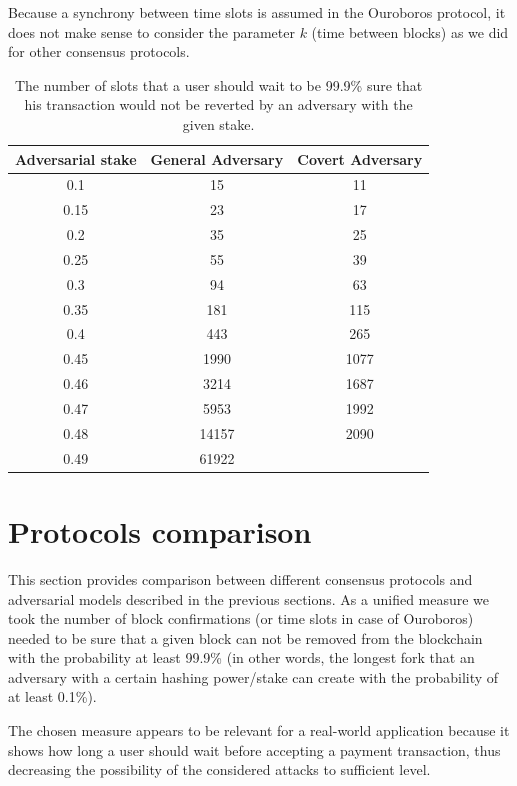 \documentclass[10pt,a4paper]{article}
\numberwithin{equation}{section} %
\theoremstyle{plain}
\theoremstyle{definition}
\theoremstyle{remark}
\begin{document}
    Because a synchrony between time slots is assumed in the Ouroboros protocol, it does not make sense to consider the parameter \(k\) (time between blocks) as we did for other consensus protocols.
    \begin{table}[h!]
        \label{tbl:ouroboros_fork_lengths}
        \centering
    \begin{tabular}{ | c || c | c | }
         \hline 
         Adversarial stake & General Adversary & Covert Adversary \\
         \hline
         0.1   & 15  & 11   \\
         0.15  & 23  & 17  \\
         0.2   & 35  & 25  \\
         0.25  & 55  & 39  \\
         0.3   & 94  & 63  \\
         0.35  & 181 & 115 \\
         0.4   & 443 & 265 \\
         0.45  & 1990  & 1077 \\
         0.46  & 3214  & 1687 \\
         0.47  & 5953  & 1992 \\
         0.48  & 14157  & 2090 \\
         0.49  & 61922  &      \\
         \hline
    \end{tabular}
    \caption{The number of slots that a user should wait to be 99.9\% sure that his transaction would not be reverted by an adversary with the given stake.}
    \end{table}
	
	\section{Protocols comparison}
	
	This section provides comparison between different consensus protocols and adversarial models described in the previous sections. As a unified measure we took the number of block confirmations (or time slots in case of Ouroboros) needed to be sure that a given block can not be removed from the blockchain with the probability at least 99.9\% (in other words, the longest fork that an adversary with a certain hashing power/stake can create with the probability of at least 0.1\%). 
	
	The chosen measure appears to be relevant for a real-world application because it shows how long a user should wait before accepting a payment transaction, thus decreasing the possibility of the considered attacks to sufficient level.
	
\end{document}
